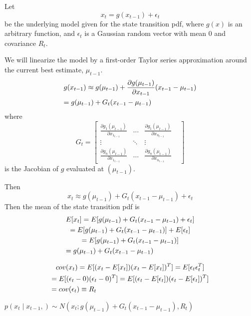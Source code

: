Let \[x_t =  g(x_{t-1}) + \epsilon_t\] be the underlying model given for the state transition pdf, where \(g(x)\) is an arbitrary function, and \(\epsilon_t\) is a Gaussian random vector with mean 0 and covariance \(R_t\).


We will linearize the model by a first-order Taylor series approximation around the current best estimate, \(\mu_{t-1}\).
\begin{multline}
g(x_{t-1}) \approx g(\mu_{t-1}) + \frac{\partial g(\mu_{t-1})}{\partial x_{t-1}} (x_{t-1} - \mu_{t-1}) \\
= g(\mu_{t-1}) + G_t (x_{t-1} - \mu_{t-1}) \hfill
\end{multline}
where \[
G_t = \begin{bmatrix} 
\frac{\partial g_1(\mu_{t-1})}{\partial x_{1_{t-1}}} & \dots & \frac{\partial g_1(\mu_{t-1})}{\partial x_{n_{t-1}}}\\
\vdots & \ddots & \vdots & \\
\frac{\partial g_n(\mu_{t-1})}{\partial x_{1_{t-1}}} & \dots & \frac{\partial g_n(\mu_{t-1})}{\partial x_{n_{t-1}}} 
\end{bmatrix} \] is the Jacobian of \(g\) evaluated at \((\mu_{t-1})\).

Then
\begin{equation} \label{eqEKFxtDef}
x_t \approx g(\mu_{t-1}) + G_t (x_{t-1} - \mu_{t-1}) + \epsilon_t
\end{equation}
Then the mean of the state transition pdf is 
\begin{multline}
E[x_t] = E[g(\mu_{t-1}) + G_t (x_{t-1} - \mu_{t-1}) + \epsilon_t] \\
= E[g(\mu_{t-1}) + G_t (x_{t-1} - \mu_{t-1})] + E[\epsilon_t] \\
= E[g(\mu_{t-1}) + G_t (x_{t-1} - \mu_{t-1})] \\
= g(\mu_{t-1}) + G_t (x_{t-1} - \mu_{t-1}) \hfill
\end{multline}

\begin{multline}
cov(x_t) = E[(x_t - E[x_t])(x_t - E[x_t])^T] = E[\epsilon_t \epsilon_t^T] \\
= E[(\epsilon_t - 0)(\epsilon_t - 0)^T] = E[(\epsilon_t - E[\epsilon_t])(\epsilon_t - E[\epsilon_t])^T] \\
= cov(\epsilon_t) \equiv R_t \hfill
\end{multline}

\(p(x_t \mathbin{\vert} x_{t-1},) \sim N(x_t;g(\mu_{t-1}) + G_t (x_{t-1} - \mu_{t-1}),R_t)\)

